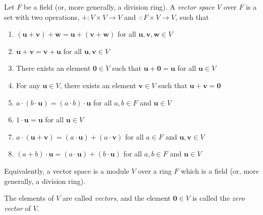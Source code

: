 \documentclass[12pt]{article}
\renewcommand{\u}{\mathbf{u}}
\renewcommand{\v}{\mathbf{v}}
\newcommand{\w}{\mathbf{w}}
\newcommand{\0}{\mathbf{0}}
\begin{document}
Let $F$ be a field (or, more generally, a division ring). A \emph{vector space} $V$ over $F$ is a set with two operations, $+: V \times V \longrightarrow V$ and $\cdot: F \times V \longrightarrow V$, such that
\begin{enumerate}
\item $(\u+\v)+\w = \u+(\v+\w)$ for all $\u,\v,\w \in V$
\item $\u+\v=\v+\u$ for all $\u,\v\in V$
\item There exists an element $\0 \in V$ such that $\u+\0=\u$ for all $\u \in V$
\item For any $\u \in V$, there exists an element $\v \in V$ such that $\u+\v=\0$
\item $a \cdot (b \cdot \u) = (a \cdot b) \cdot \u$ for all $a,b \in F$ and $\u \in V$
\item $1 \cdot \u = \u$ for all $\u \in V$
\item $a \cdot (\u+\v) = (a \cdot \u) + (a \cdot \v)$ for all $a \in F$ and $\u,\v \in V$
\item $(a+b) \cdot \u = (a \cdot \u) + (b \cdot \u)$ for all $a,b \in F$ and $\u \in V$
\end{enumerate}

Equivalently, a vector space is a module $V$ over a ring $F$ which is a field (or, more generally, a division ring).

The elements of $V$ are called \emph{vectors}, and the element $\0 \in V$ is called the \emph{zero vector} of $V$.
\end{document}
